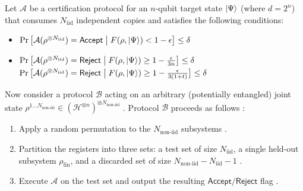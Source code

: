 \documentclass[a4paper,twocolumn,11pt,unpublished]{../../revision/quantumarticle}
\newcommand{\Accept}{\mathsf{Accept}}
\newcommand{\Reject}{\mathsf{Reject}}
\newcommand{\Niid}{N_{\mathrm{iid}}}
\newcommand{\Nnoniid}{N_{\mathrm{non\text{-}iid}}}
\providecommand{\DIFadd}[1]{{\protect\color{blue} \sf #1}} %
\providecommand{\DIFdel}[1]{{\protect\color{red} \scriptsize #1}} %
\providecommand{\DIFaddbegin}{} %
\providecommand{\DIFaddend}{} %
\providecommand{\DIFdelbegin}{} %
\providecommand{\DIFdelend}{} %
\begin{document}
\begin{lemma}
\label{lemma:prelim:iid}
Let $\mathcal{A}$ be a certification protocol for an $n$-qubit target state $\ket{\Psi}$ (where $d=2^n$) that consumes $\Niid$ independent copies and satisfies the following conditions:

\begin{itemize}
    \item 
    $\Pr\left[\mathcal{A}(\rho^{\otimes \Niid}) = \Accept \; \middle|\;  F(\rho, \ket{\Psi}) < 1-\epsilon\right] \leq \delta$
    \item 
    \DIFdelbegin \DIFdel{$\Pr\left[\mathcal{A}(\rho^{\otimes \Niid}) = \Reject \; \middle|\;  F(\rho, \ket{\Psi}) \geq 1-\frac{\epsilon}{3n}\right] \leq \delta$ 
}\DIFdelend \DIFaddbegin \DIFadd{$\Pr\big[\mathcal{A}(\rho^{\otimes \Niid}) = \Reject \;\big|\;  F(\rho, \ket{\Psi}) \geq 1-\frac{\epsilon}{3(1+t)}\big] \leq \delta$ 
}\DIFaddend \end{itemize}

Now consider a protocol $\mathcal{B}$ acting on an arbitrary (potentially entangled) joint state $\rho^{1\ldots \Nnoniid} \in (\mathcal{H}^{\otimes n})^{\otimes \Nnoniid}$ . Protocol $\mathcal{B}$ proceeds as follows :
\begin{enumerate}
    \item Apply a random permutation to the $\Nnoniid$ subsystems .
    \item Partition the registers into three sets: a test set of size $\Niid$, a single held-out subsystem $\rho_{\mathrm{fin}}$, and a discarded set of size $\Nnoniid - \Niid - 1$ .
    \item Execute $\mathcal{A}$ on the test set and output the resulting $\Accept/\Reject$ flag .
\end{enumerate}


\end{lemma}
\end{document}
